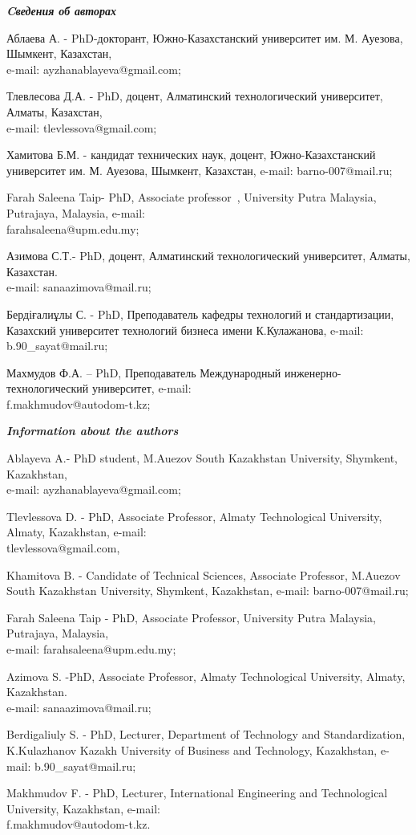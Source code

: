\begin{authorinfo}
\emph{{\bfseries Cведения об авторах}}

Аблаева А. - PhD-докторант, Южно-Казахстанский университет им. М.
Ауезова, Шымкент, Казахстан,\\ e-mail: ayzhanablayeva@gmail.com;

Тлевлесова Д.А. - PhD, доцент, Алматинский технологический университет,
Алматы, Казахстан,\\ e-mail: tlevlessova@gmail.com;

Хамитова Б.М. - кандидат технических наук, доцент, Южно-Казахстанский
университет им. М. Ауезова, Шымкент, Казахстан, e-mail: barno-007@mail.ru;

Farah Saleena Taip- PhD, Associate professor~, University Putra
Malaysia, Putrajaya, Malaysia, e-mail: \\farahsaleena@upm.edu.my;

Азимова С.Т.- PhD, доцент, Алматинский технологический университет,
Алматы, Казахстан.\\ e-mail: sanaazimova@mail.ru;

Бердіғалиұлы С. - PhD, Преподаватель кафедры технологий и
стандартизации, Казахский университет технологий бизнеса имени
К.Кулажанова, e-mail: b.90\_sayat@mail.ru;

Махмудов Ф.А. -- PhD, Преподаватель Международный
инженерно-технологический университет, e-mail: \\f.makhmudov@autodom-t.kz;

\emph{{\bfseries Information about the authors}}

Ablayeva A.- PhD student, M.Auezov South Kazakhstan University,
Shymkent, Kazakhstan,\\ e-mail: ayzhanablayeva@gmail.com;

Tlevlessova D. - PhD, Associate Professor, Almaty Technological
University, Almaty, Kazakhstan, e-mail: \\tlevlessova@gmail.com,

Khamitova B. - Candidate of Technical Sciences, Associate Professor,
M.Auezov South Kazakhstan University, Shymkent, Kazakhstan, e-mail:
barno-007@mail.ru;

Farah Saleena Taip - PhD, Associate Professor, University Putra
Malaysia, Putrajaya, Malaysia,\\ e-mail: farahsaleena@upm.edu.my;

Azimova S. -PhD, Associate Professor, Almaty Technological University,
Almaty, Kazakhstan.\\ e-mail: sanaazimova@mail.ru;

Berdigaliuly S. - PhD, Lecturer, Department of Technology and
Standardization, K.Kulazhanov Kazakh University of Business and
Technology, Kazakhstan, e-mail: b.90\_sayat@mail.ru;

Makhmudov F. - PhD, Lecturer, International Engineering and
Technological University, Kazakhstan, e-mail: \\f.makhmudov@autodom-t.kz.
\end{authorinfo}
